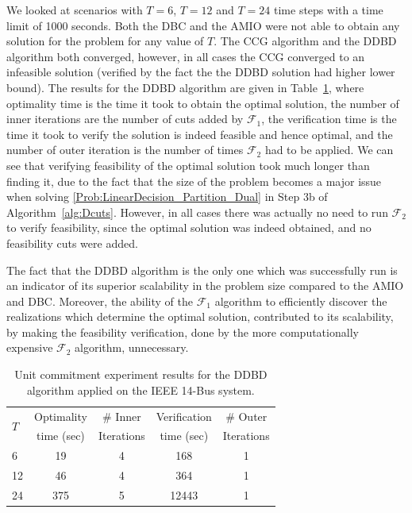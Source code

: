\documentclass[12pt,x11names]{article}
\theoremstyle{definition}
\begin{document}
We looked at scenarios with $T=6$, $T=12$ and $T=24$ time steps with a time limit of 1000 seconds. Both the DBC and the AMIO were not able to obtain any solution for the problem for any value of $T$.
The CCG algorithm and the DDBD algorithm both converged, however, in all cases the CCG converged to an infeasible solution (verified by the fact the the DDBD solution had higher lower bound). The results for the DDBD algorithm are given in Table~\ref{tbl:unit commitment}, where optimality time is the time it took to obtain the optimal solution, the number of inner iterations are the number of cuts added by $\mathcal{F}_1$, the verification time is the time it took to verify the solution is indeed feasible and hence optimal, and the number of outer iteration is the number of times $\mathcal{F}_2$ had to be applied. We can see that verifying feasibility of the optimal solution took much longer than finding it, due to the fact that the size of the problem becomes a major issue when solving \eqref{Prob:LinearDecision_Partition_Dual} in Step 3b of Algorithm~\ref{alg:Dcuts}. However, in all cases there was actually no need to run $\mathcal{F}_2$ to verify feasibility, since the optimal solution was indeed obtained, and no feasibility cuts were added.

The fact that the DDBD algorithm is the only one which was successfully run is an indicator of its superior scalability in the  problem size compared to the AMIO and DBC. Moreover, the ability of the $\mathcal{F}_1$ algorithm to efficiently discover the realizations which determine the optimal solution, contributed to its scalability, by making the feasibility verification, done by the more computationally expensive $\mathcal{F}_2$ algorithm, unnecessary. 
\begin{table}[h]
\centering
\caption{Unit commitment experiment results for the DDBD algorithm applied on the IEEE 14-Bus system.}
\label{tbl:unit commitment}
{\renewcommand{\arraystretch}{0.7}
\setlength{\extrarowheight}{.1em}
\begin{tabular}{|l|c|c|c|c|}
\hline
\multirow{2}{*}{$T$} & Optimality & \# Inner &Verification & \# Outer\\
& time (sec) &  Iterations & time (sec) & Iterations\\
\hline
\hline
6 & 19 & 4 &168 & 1\\
12 & 46 & 4 & 364 & 1\\
24 & 375 & 5& 12443& 1\\
\hline
\end{tabular}}
\end{table}
\end{document}

